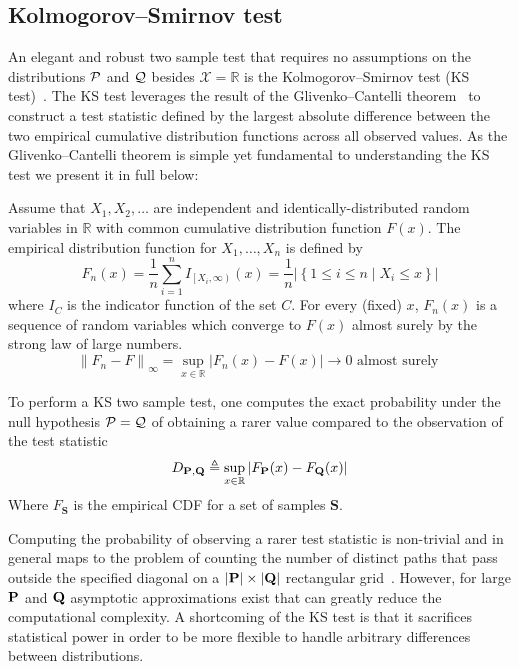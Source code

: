 \smallbreak
\subsection*{Kolmogorov–Smirnov test} An elegant and robust two sample test that requires no assumptions on the distributions $\mathcal{P}$ and $\mathcal{Q}$ besides $\mathcal{X}=\mathbb{R}$ is the {Kolmogorov–Smirnov test} (KS test)~\citep{kolmogorov1933sulla}.
The KS test leverages the result of the Glivenko–Cantelli theorem~\citep{glivenko1933sulla} to construct a test statistic defined by the largest absolute difference between the two empirical cumulative distribution functions across all observed values.
As the Glivenko–Cantelli theorem is simple yet fundamental to understanding the KS test we present it in full below:
\begin{theorem}
    Assume that $X_1,X_2,\dots$ are independent and identically-distributed random variables in $\mathbb {R}$  with common cumulative distribution function $F(x)$.
    The empirical distribution function for $X_{1},\dots ,X_{n}$ is defined by
    \begin{equation}
        F_n(x)=\frac{1}{n} \sum_{i=1}^n I_{\left[X_i, \infty\right)}(x)=\frac{1}{n}\left|\left\{1 \leq i \leq n \mid X_i \leq x\right\}\right|\label{eq:empdist}
    \end{equation}
    where $I_{C}$ is the indicator function of the set $C$.
    \noindent
    For every (fixed) $x$, $F_n(x)$ is a sequence of random variables which converge to $F(x)$ almost surely by the strong law of large numbers.
    \begin{equation}
        \left\|F_n-F\right\|_{\infty}=\sup _{x \in \mathbb{R}}\left|F_n(x)-F(x)\right| \longrightarrow 0 \text { almost surely }
    \end{equation}
\end{theorem}

To perform a KS two sample test, one computes the exact probability under the null hypothesis $\mathcal{P}=\mathcal{Q}$ of obtaining a rarer value compared to the observation of the test statistic
\[D_{\mathbf{P},\mathbf{Q}}\triangleq \sup_{x \in \mathbb{R}}\left|F_{\mathbf{P}}(x)-F_{\mathbf{Q}}(x)\right|\]
Where $F_{\mathbf{S}}$ is the empirical CDF for a set of samples $\mathbf{S}$.

Computing the probability of observing a rarer test statistic is non-trivial and in general maps to the problem of counting the number of distinct paths that pass outside the specified diagonal on a $|\mathbf{P}| \times |\mathbf{Q}|$ rectangular grid~\citep{drew2000computing}.
However, for large $\mathbf{P}$ and $\mathbf{Q}$ asymptotic approximations exist that can greatly reduce the computational complexity.
A shortcoming of the KS test is that it sacrifices statistical power in order to be more flexible to handle arbitrary differences between distributions.

